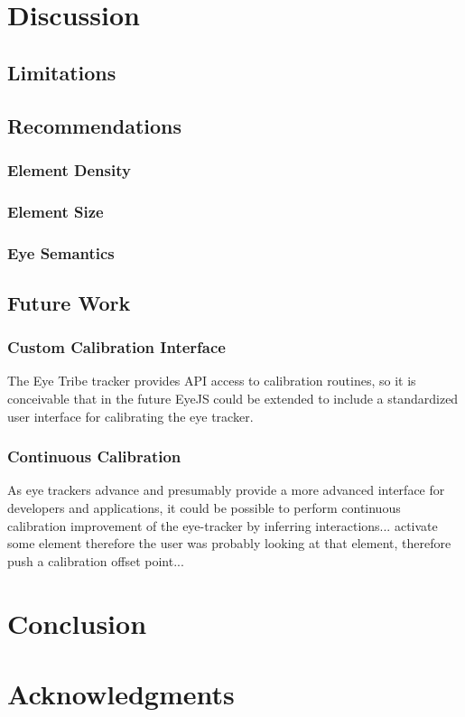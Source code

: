 \documentclass{sigchi}
\begin{document}
\section{Discussion}


\subsection{Limitations}


\subsection{Recommendations}

\subsubsection{Element Density}

\subsubsection{Element Size}

\subsubsection{Eye Semantics}


\subsection{Future Work}

\subsubsection{Custom Calibration Interface}
The Eye Tribe tracker provides API access to calibration routines, so it is conceivable that in the future EyeJS could be extended to include a standardized user interface for calibrating the eye tracker.

\subsubsection{Continuous Calibration}
As eye trackers advance and presumably provide a more advanced interface for developers and applications, it could be possible to perform continuous calibration improvement of the eye-tracker by inferring interactions... activate some element therefore the user was probably looking at that element, therefore push a calibration offset point...



\section{Conclusion}



\section{Acknowledgments}



\balance{}



\end{document}
